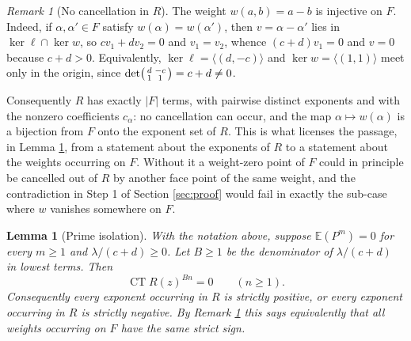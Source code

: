\documentclass[11pt]{amsart}
\theoremstyle{plain}
\newtheorem{lemma}[theorem]{Lemma}
\theoremstyle{remark}
\newtheorem{remark}[theorem]{Remark}
\numberwithin{equation}{section}
\DeclareMathOperator{\CT}{CT}
\newcommand{\E}{\mathbb{E}}
\begin{document}
\begin{remark}[No cancellation in $R$]\label{rem:injective}
The weight $w(a,b)=a-b$ is injective on $F$. Indeed, if $\alpha,\alpha'\in F$
satisfy $w(\alpha)=w(\alpha')$, then $v=\alpha-\alpha'$ lies in
$\ker\ell\cap\ker w$, so $cv_1+dv_2=0$ and $v_1=v_2$, whence $(c+d)v_1=0$ and
$v=0$ because $c+d>0$. Equivalently, $\ker\ell=\langle(d,-c)\rangle$ and
$\ker w=\langle(1,1)\rangle$ meet only in the origin, since
$\det\begin{psmallmatrix}d&-c\\1&1\end{psmallmatrix}=c+d\ne0$.

Consequently $R$ has exactly $|F|$ terms, with pairwise distinct exponents and
with the nonzero coefficients $c_\alpha$: no cancellation can occur, and the
map $\alpha\mapsto w(\alpha)$ is a bijection from $F$ onto the exponent set of
$R$. This is what licenses the passage, in Lemma \ref{lem:isolation}, from a
statement about the exponents of $R$ to a statement about the weights occurring
on $F$. Without it a weight-zero point of $F$ could in principle be cancelled
out of $R$ by another face point of the same weight, and the contradiction in
Step 1 of Section \ref{sec:proof} would fail in exactly the sub-case where $w$
vanishes somewhere on $F$.
\end{remark}

\begin{lemma}[Prime isolation]\label{lem:isolation}
With the notation above, suppose $\E(P^m)=0$ for every $m\ge1$ and
$\lambda/(c+d)\ge0$. Let $B\ge1$ be the denominator of $\lambda/(c+d)$ in lowest
terms. Then
\begin{equation}\label{eq:CTvanish}
  \CT R(z)^{Bn}=0 \qquad (n\ge1).
\end{equation}
Consequently every exponent occurring in $R$ is strictly positive, or every
exponent occurring in $R$ is strictly negative. By Remark \ref{rem:injective}
this says equivalently that all weights occurring on $F$ have the same strict
sign.
\end{lemma}
\end{document}
